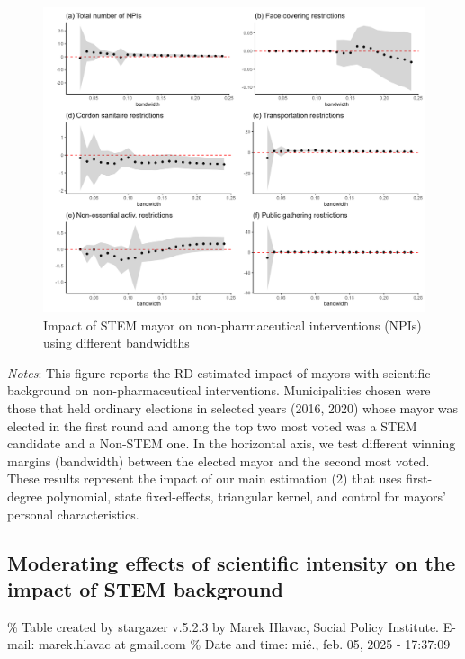 \documentclass[
  letterpaper,
  DIV=11,
  numbers=noendperiod]{scrartcl}
\begin{document}
\begin{figure}[H]

\caption{Impact of STEM mayor on non-pharmaceutical interventions (NPIs)
using different bandwidths}

{\centering \includegraphics{outputs/figures/npi_rob.png}

}

\end{figure}%

\emph{Notes}: This figure reports the RD estimated impact of mayors with
scientific background on non-pharmaceutical interventions.
Municipalities chosen were those that held ordinary elections in
selected years (2016, 2020) whose mayor was elected in the first round
and among the top two most voted was a STEM candidate and a Non-STEM
one. In the horizontal axis, we test different winning margins
(bandwidth) between the elected mayor and the second most voted. These
results represent the impact of our main estimation (2) that uses
first-degree polynomial, state fixed-effects, triangular kernel, and
control for mayors' personal characteristics.

\subsection{Moderating effects of scientific intensity on the impact of
STEM
background}\label{moderating-effects-of-scientific-intensity-on-the-impact-of-stem-background}

\% Table created by stargazer v.5.2.3 by Marek Hlavac, Social Policy
Institute. E-mail: marek.hlavac at gmail.com \% Date and time: mié.,
feb. 05, 2025 - 17:37:09
\end{document}
